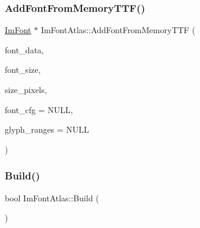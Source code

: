 \subsubsection{\texorpdfstring{Add\+Font\+From\+Memory\+T\+T\+F()}{AddFontFromMemoryTTF()}}
{\footnotesize\ttfamily \mbox{\hyperlink{struct_im_font}{Im\+Font}} $\ast$ Im\+Font\+Atlas\+::\+Add\+Font\+From\+Memory\+T\+TF (\begin{DoxyParamCaption}\item[{void $\ast$}]{font\+\_\+data,  }\item[{int}]{font\+\_\+size,  }\item[{float}]{size\+\_\+pixels,  }\item[{const \mbox{\hyperlink{struct_im_font_config}{Im\+Font\+Config}} $\ast$}]{font\+\_\+cfg = {\ttfamily NULL},  }\item[{const \mbox{\hyperlink{imgui_8h_af2c7badaf05a0008e15ef76d40875e97}{Im\+Wchar}} $\ast$}]{glyph\+\_\+ranges = {\ttfamily NULL} }\end{DoxyParamCaption})}

\mbox{\label{struct_im_font_atlas_a81e39e30dffa4dd7e458a53297451e27}} 
\subsubsection{\texorpdfstring{Build()}{Build()}}
{\footnotesize\ttfamily bool Im\+Font\+Atlas\+::\+Build (\begin{DoxyParamCaption}{ }\end{DoxyParamCaption})}

